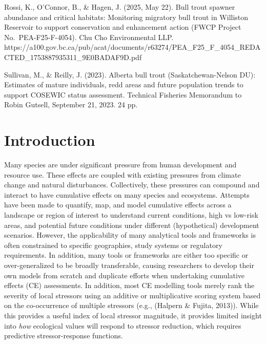 \documentclass[
  letterpaper,
  DIV=11,
  numbers=noendperiod]{scrreprt}
\begin{document}
Rossi, K., O'Connor, B., \& Hagen, J. (2025, May 22). Bull trout spawner
abundance and critical habitats: Monitoring migratory bull trout in
Williston Reservoir to support conservation and enhancement action (FWCP
Project No.~PEA-F25-F-4054). Chu Cho Environmental LLP.
https://a100.gov.bc.ca/pub/acat/documents/r63274/PEA\_F25\_F\_4054\_REDACTED\_1753887935311\_9E0BADAF9D.pdf

Sullivan, M., \& Reilly, J. (2023). Alberta bull trout
(Saskatchewan-Nelson DU): Estimates of mature individuals, redd areas
and future population trends to support COSEWIC status assessment.
Technical Fisheries Memorandum to Robin Gutsell, September 21, 2023. 24
pp.


\chapter{Introduction}\label{introduction}

Many species are under significant pressure from human development and
resource use. These effects are coupled with existing pressures from
climate change and natural disturbances. Collectively, these pressures
can compound and interact to have cumulative effects on many species and
ecosystems. Attempts have been made to quantify, map, and model
cumulative effects across a landscape or region of interest to
understand current conditions, high vs low-risk areas, and potential
future conditions under different (hypothetical) development scenarios.
However, the applicability of many analytical tools and frameworks is
often constrained to specific geographies, study systems or regulatory
requirements. In addition, many tools or frameworks are either too
specific or over-generalized to be broadly transferable, causing
researchers to develop their own models from scratch and duplicate
efforts when undertaking cumulative effects (CE) assessments. In
addition, most CE modelling tools merely rank the severity of local
stressors using an additive or multiplicative scoring system based on
the co-occurrence of multiple stressors (e.g., (Halpern \& Fujita,
2013)). While this provides a useful index of local stressor magnitude,
it provides limited insight into \emph{how} ecological values will
respond to stressor reduction, which requires predictive
stressor-response functions.
\end{document}
